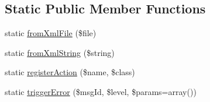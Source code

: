 \subsection*{\-Static \-Public \-Member \-Functions}
\begin{DoxyCompactItemize}
\item 
static \hyperlink{class_p_e_a_r2_1_1_console_1_1_command_line_a3e1515970d74fe0a779def6f95026e47}{from\-Xml\-File} (\$file)
\item 
static \hyperlink{class_p_e_a_r2_1_1_console_1_1_command_line_af00a0bd2cb31659e6bbc86d9f2d68e2a}{from\-Xml\-String} (\$string)
\item 
static \hyperlink{class_p_e_a_r2_1_1_console_1_1_command_line_a9da001bf263df32bd49d259b5e42a294}{register\-Action} (\$name, \$class)
\item 
static \hyperlink{class_p_e_a_r2_1_1_console_1_1_command_line_a7d983b16c2cb57cefa229686c486a8f9}{trigger\-Error} (\$msg\-Id, \$level, \$params=array())
\end{DoxyCompactItemize}
